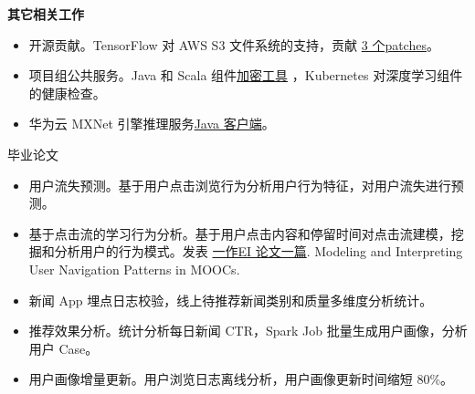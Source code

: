 \documentclass{resume}
\begin{document}
\begin{onehalfspacing}
\textbf{其它相关工作}  
\begin{itemize}%
  \item 开源贡献。TensorFlow 对 AWS S3 文件系统的支持，贡献 \href{https://github.com/tensorflow/tensorflow/pull/11089#issuecomment-320258536}{3 个patches}。
  \item 项目组公共服务。Java 和 Scala 组件\href{https://github.com/neuzxy/AESCryptTools}{加密工具} ，Kubernetes 对深度学习组件的健康检查。 
  \item 华为云 MXNet 引擎推理服务\href{https://github.com/huawei-clouds/dls-mxserving-client/tree/master/java}{Java 客户端}。
\end{itemize}
\end{onehalfspacing}

 {毕业论文}
\begin{itemize}[parsep=0.5ex]
  \item 用户流失预测。基于用户点击浏览行为分析用户行为特征，对用户流失进行预测。
  \item 基于点击流的学习行为分析。基于用户点击内容和停留时间对点击流建模，挖掘和分析用户的行为模式。发表 \href{http://storage.cparty.co/user/02ct718cKf/activity/20161229092844J3VFZT9Q/publishnews/attachment_20170705055506001499234106971251_file}{一作EI 论文一篇}. Modeling and Interpreting User Navigation Patterns in MOOCs.
\end{itemize}


\begin{itemize}[parsep=0.5ex]
  \item 新闻 App 埋点日志校验，线上待推荐新闻类别和质量多维度分析统计。
  \item 推荐效果分析。统计分析每日新闻 CTR，Spark Job 批量生成用户画像，分析用户 Case。
  \item 用户画像增量更新。用户浏览日志离线分析，用户画像更新时间缩短 80\%。
\end{itemize}

\end{document}
